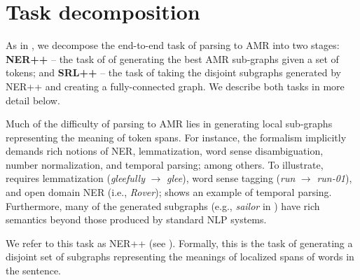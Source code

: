 \documentclass[11pt]{article}
\begin{document}
\section{Task decomposition}
As in , we decompose the end-to-end task of parsing to AMR into two stages:
  \textbf{NER++} -- the task of of generating the best AMR sub-graphs given a set of tokens; and
  \textbf{SRL++} -- the task of taking the disjoint subgraphs generated
  by NER++ and creating a fully-connected graph.
We describe both tasks in more detail below.

Much of the difficulty of parsing to AMR lies in generating local sub-graphs representing the meaning of token spans.
For instance, the formalism implicitly demands rich notions of NER, lemmatization, word sense disambiguation, number normalization, and temporal parsing; among others.
To illustrate,  requires lemmatization (\textit{gleefully} $\rightarrow$ \textit{glee}), word sense tagging (\textit{run} $\rightarrow$ \textit{run-01}), and open domain NER (i.e., \textit{Rover});  shows an example of temporal parsing.
Furthermore, many of the generated subgraphs (e.g., \textit{sailor} in ) have rich semantics beyond those produced by standard NLP systems.

We refer to this task as NER++ (see ).
Formally, this is the task of generating a disjoint set of subgraphs representing the meanings of localized spans of words in the sentence.

\end{document}
